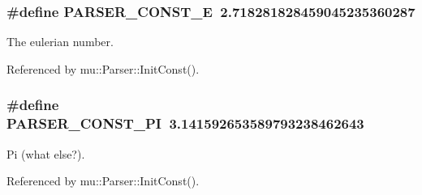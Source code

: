 \subsubsection[PARSER\_\-CONST\_\-E]{\setlength{\rightskip}{0pt plus 5cm}\#define PARSER\_\-CONST\_\-E~2.718281828459045235360287}\label{muParser_8cpp_4ab603294085c34e8c659fa4e84d7e8c}


The eulerian number. 



Referenced by mu::Parser::InitConst().
\subsubsection[PARSER\_\-CONST\_\-PI]{\setlength{\rightskip}{0pt plus 5cm}\#define PARSER\_\-CONST\_\-PI~3.141592653589793238462643}\label{muParser_8cpp_63af9517c2e94ffd215fea964afb162c}


Pi (what else?). 



Referenced by mu::Parser::InitConst().